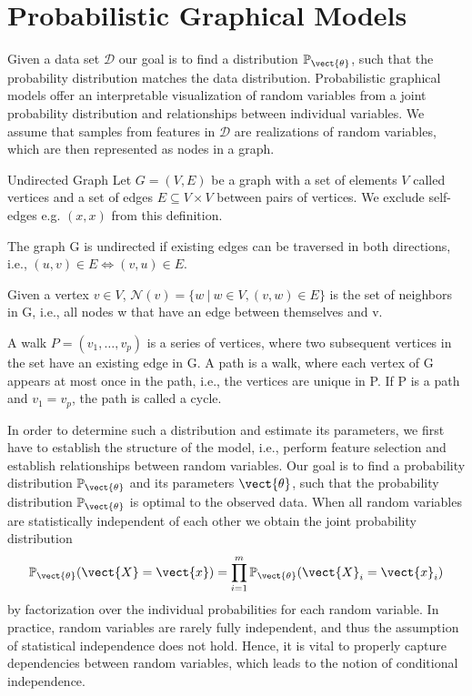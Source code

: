 \section{Probabilistic Graphical Models}
\label{sec:pgm}
Given a data set $\mathcal{D}$ our goal is to find a distribution $\mathbb{P}_{\vect{\theta}}$, such that the probability distribution matches the data distribution.
Probabilistic graphical models offer an interpretable visualization of random variables from a joint probability distribution and relationships between individual variables.
We assume that samples from features in $\mathcal{D}$ are realizations of random variables, which are then represented as nodes in a graph.
    \begin{definition}{Undirected Graph}
        Let $G=(V,E)$ be a graph with a set of elements $V$ called vertices and a set of edges $E \subseteq V \times V$ between pairs of vertices. 
        We exclude self-edges e.g. $(x,x)$ from this definition.

        The graph G is undirected if existing edges can be traversed in both directions, i.e., $(u,v) \in E \Leftrightarrow (v,u) \in E$.

        Given a vertex $v \in V$, $\mathcal{N}(v) = \{w \:\lvert\: w \in V, (v,w) \in E\}$ is the set of neighbors in G, i.e., all nodes w that have an edge between themselves and v.

        A walk $P = (v_1, \ldots, v_p)$ is a series of vertices, where two subsequent vertices in the set have an existing edge in G. 
        A path is a walk, where each vertex of G appears at most once in the path, i.e., the vertices are unique in P.
        If P is a path and $v_1 = v_p$, the path is called a cycle.
    \end{definition}
In order to determine such a distribution and estimate its parameters, we first have to establish the structure of the model, i.e., perform feature selection and establish relationships between random variables.
Our goal is to find a probability distribution $\mathbb{P}_{\vect{\theta}}$ and its parameters $\vect{\theta}$, such that the probability distribution $\mathbb{P}_{\vect{\theta}}$ is optimal \wrt to the observed data.
When all random variables are statistically independent of each other  we obtain the joint probability distribution
\begin{equation}
    \mathbb{P}_{\vect{\theta}}(\vect{X} = \vect{x}) = \prod_{i=1}^m \mathbb{P}_{\vect{\theta}}(\vect{X}_i = \vect{x}_i)
\end{equation}
by factorization over the individual probabilities for each random variable.
In practice, random variables are rarely fully independent, and thus the assumption of statistical independence does not hold.
Hence, it is vital to properly capture dependencies between random variables, which leads to the notion of conditional independence.

